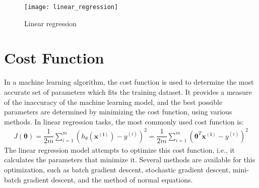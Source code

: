 \documentclass[a4paper, 12pt]{report}
\begin{document}
\begin{figure}[H]
\centering
\texttt{[image: linear\_regression]}
\caption{Linear regression}
\end{figure}

\section{Cost Function}
In a machine learning algorithm, the cost function is used to determine the most accurate set of parameters which fits the training dataset. It provides a measure of the inaccuracy of the machine learning model, and the best possible parameters are determined by minimizing the cost function, using various methods. In linear regression tasks, the most commonly used cost function is:
\begin{align*}
J\left(\bm{\theta}\right) = \dfrac{1}{2m}\sum_{i=1}^{m}\left(h_{\theta}\left(\bm{x^{\left(i\right)}}\right)-y^{\left(i\right)}\right)^2 = \dfrac{1}{2m}\sum_{i=1}^{m}\left(\bm{\theta}^T\bm{x^{\left(i\right)}}-y^{\left(i\right)}\right)^2
\end{align*}
The linear regression model attempts to optimize this cost function, i.e., it calculates the parameters that minimize it. Several methods are available for this optimization, such as batch gradient descent, stochastic gradient descent, mini-batch gradient descent, and the method of normal equations.
\end{document}
